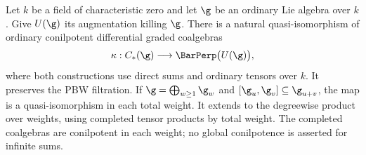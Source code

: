 \begin{theorem}
\label{thm:bar-chevalley-spine}
Let $k$ be a field of characteristic zero and let $\g$ be an ordinary Lie algebra over $k$.
Give $U(\g)$ its augmentation killing $\g$.
There is a natural quasi-isomorphism of ordinary conilpotent differential graded coalgebras
\[
 \kappa:C_*(\g)\longrightarrow\BarPerp\bigl(U(\g)\bigr),
\]
where both constructions use direct sums and ordinary tensors over $k$.
It preserves the PBW filtration.
If $\g=\bigoplus_{w\ge1}\g_w$ and $[\g_u,\g_v]\subseteq\g_{u+v}$,
the map is a quasi-isomorphism in each total weight.
It extends to the degreewise product over weights, using completed tensor products by total weight.
The completed coalgebras are conilpotent in each weight; no global conilpotence is asserted for infinite sums.
\end{theorem}
